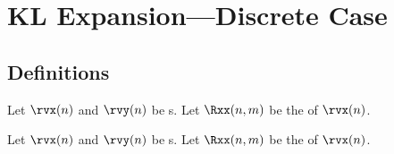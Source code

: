 
\chapter{KL Expansion---Discrete Case}
\section{Definitions}
\label{sec:KL}
\begin{definition}
\label{def:opRnm}
Let $\rvx(n)$ and $\rvy(n)$ be s. 
Let $\Rxx(n,m)$ be the   of $\rvx(n)$.
\end{definition}

\begin{definition}
\label{def:white_seq}
Let $\rvx(n)$ and $\rvy(n)$ be s. 
Let $\Rxx(n,m)$ be the  of $\rvx(n)$.
\end{definition}


